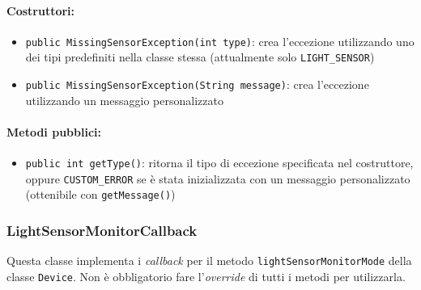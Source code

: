 \paragraph{Costruttori:}\begin{itemize}
	\item \texttt{public MissingSensorException(int type)}: crea l'eccezione utilizzando uno dei tipi predefiniti nella classe stessa (attualmente solo \texttt{LIGHT\_SENSOR})
	\item \texttt{public MissingSensorException(String message)}: crea l'eccezione utilizzando un messaggio personalizzato
\end{itemize}

\paragraph{Metodi pubblici:}\begin{itemize}
	\item \texttt{public int getType()}: ritorna il tipo di eccezione specificata nel costruttore, oppure \texttt{CUSTOM\_ERROR} se è stata inizializzata con un messaggio personalizzato (ottenibile con \texttt{getMessage()})
\end{itemize}

\subsubsection{LightSensorMonitorCallback}
Questa classe implementa i \textit{callback} per il metodo \texttt{lightSensorMonitorMode} della classe \texttt{Device}. Non è obbligatorio fare l'\textit{override} di tutti i metodi per utilizzarla.

